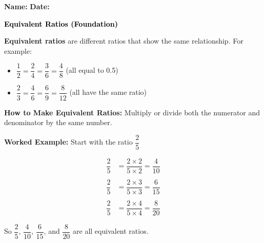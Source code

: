 \documentclass[12pt, letterpaper, fleqn]{article}
\begin{document}
\textbf{Name:} \underline{\hspace{5cm}}
\hfill
\textbf{Date:} \underline{\hspace{3cm}}\\

\begin{tcolorbox}[colback=customteal!20]
    \large\textcolor{black}{\textbf{Equivalent Ratios (Foundation)}}
\end{tcolorbox}

\vspace{3mm}

\noindent
\textbf{Equivalent ratios} are different ratios that show the same relationship. For example:

\vspace{1cm}

\begin{itemize}
    \item $\dfrac{1}{2} = \dfrac{2}{4} = \dfrac{3}{6} = \dfrac{4}{8}$ (all equal to 0.5)
    \item $\dfrac{2}{3} = \dfrac{4}{6} = \dfrac{6}{9} = \dfrac{8}{12}$ (all have the same ratio)
\end{itemize}

\medskip

\vspace{1cm}

\noindent
\textbf{How to Make Equivalent Ratios:} Multiply or divide both the numerator and denominator by the same number.

\vspace{1cm}

\begin{tcolorbox}[colback=white, colframe=black!25, boxrule=0.6pt, arc=4mm, left=6mm, right=6mm, top=5mm, bottom=5mm]

\textbf{Worked Example:} Start with the ratio $\dfrac{2}{5}$

\vspace{0.5cm}

\begin{align*}
\dfrac{2}{5} &= \dfrac{2 \times 2}{5 \times 2} = \dfrac{4}{10} \\ \\
\dfrac{2}{5} &= \dfrac{2 \times 3}{5 \times 3} = \dfrac{6}{15} \\ \\
\dfrac{2}{5} &= \dfrac{2 \times 4}{5 \times 4} = \dfrac{8}{20}
\end{align*}

\vspace{1cm}

\noindent
So $\dfrac{2}{5}$, $\dfrac{4}{10}$, $\dfrac{6}{15}$, and $\dfrac{8}{20}$ are all equivalent ratios.

\end{tcolorbox}
\end{document}
